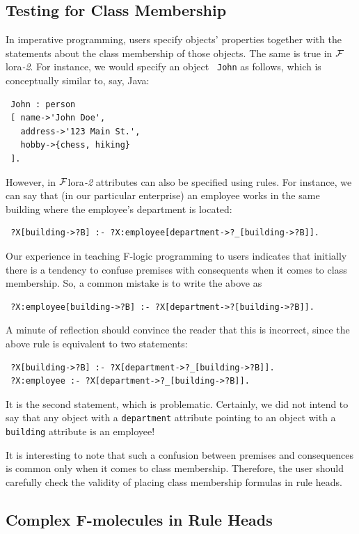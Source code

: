 \documentclass[11pt]{article}
\newcommand{\FLORA}{{\mbox{\sc ${\cal F}${lora}\rm\emph{-2}}}\xspace}
\begin{document}
\subsection{Testing for Class Membership}

In imperative programming, users specify objects' properties together with
the statements about the class membership of those objects.
The same is true in \FLORA. For instance, we would specify an object {\tt
  John} as follows, which is conceptually similar to, say, Java:
\begin{verbatim}
 John : person
 [ name->'John Doe',
   address->'123 Main St.',
   hobby->{chess, hiking}
 ].
\end{verbatim}
However, in \FLORA attributes can also be specified using rules. For
instance, we can say that (in our particular enterprise)
an employee works in the same building where the employee's department is
located:
\begin{verbatim}
 ?X[building->?B] :- ?X:employee[department->?_[building->?B]].  
\end{verbatim}
Our experience in teaching F-logic programming to users indicates that
initially there is a tendency to confuse premises with consequents when it
comes to class membership. So, a common mistake is to write the above as
\begin{verbatim}
 ?X:employee[building->?B] :- ?X[department->?[building->?B]].  
\end{verbatim}
A minute of reflection should convince the reader that this is incorrect, since
the above rule is equivalent to two statements:
\begin{verbatim}
 ?X[building->?B] :- ?X[department->?_[building->?B]].  
 ?X:employee :- ?X[department->?_[building->?B]].
\end{verbatim}
It is the second statement, which is problematic. Certainly, we did not
intend to say that any object with a {\tt department} attribute pointing to
an object with a {\tt building} attribute is an employee!

It is interesting to note that such a confusion between premises and
consequences is common only when it comes to class membership. Therefore,
the user should carefully check the validity of placing class membership
formulas in rule heads.

\subsection{Complex F-molecules in Rule Heads}
\end{document}
